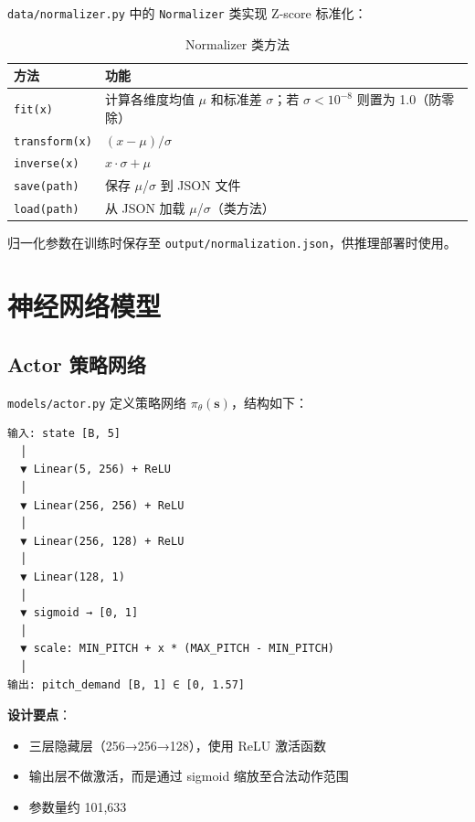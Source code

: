 \documentclass[11pt,a4paper]{ctexart}
\newcommand{\file}[1]{\texttt{#1}}
\newcommand{\code}[1]{\texttt{#1}}
\begin{document}
\file{data/normalizer.py} 中的 \code{Normalizer} 类实现 Z-score 标准化：

\begin{table}[H]
\centering
\caption{Normalizer 类方法}
\begin{tabular}{ll}
\toprule
\textbf{方法} & \textbf{功能} \\
\midrule
\code{fit(x)}     & 计算各维度均值 $\mu$ 和标准差 $\sigma$；若 $\sigma < 10^{-8}$ 则置为 1.0（防零除） \\
\code{transform(x)} & $(x - \mu) / \sigma$ \\
\code{inverse(x)}   & $x \cdot \sigma + \mu$ \\
\code{save(path)}   & 保存 $\mu$/$\sigma$ 到 JSON 文件 \\
\code{load(path)}   & 从 JSON 加载 $\mu$/$\sigma$（类方法） \\
\bottomrule
\end{tabular}
\end{table}

归一化参数在训练时保存至 \file{output/normalization.json}，供推理部署时使用。

\newpage

\section{神经网络模型}

\subsection{Actor 策略网络}

\file{models/actor.py} 定义策略网络 $\pi_{\theta}(\mathbf{s})$，结构如下：

\begin{verbatim}
输入: state [B, 5]
  │
  ▼ Linear(5, 256) + ReLU
  │
  ▼ Linear(256, 256) + ReLU
  │
  ▼ Linear(256, 128) + ReLU
  │
  ▼ Linear(128, 1)
  │
  ▼ sigmoid → [0, 1]
  │
  ▼ scale: MIN_PITCH + x * (MAX_PITCH - MIN_PITCH)
  │
输出: pitch_demand [B, 1] ∈ [0, 1.57]
\end{verbatim}

\textbf{设计要点}：
\begin{itemize}
    \item 三层隐藏层（256→256→128），使用 ReLU 激活函数
    \item 输出层不做激活，而是通过 sigmoid 缩放至合法动作范围
    \item 参数量约 101,633
\end{itemize}
\end{document}
